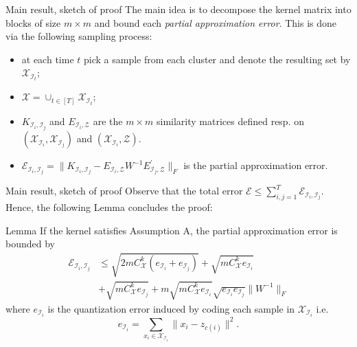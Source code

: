\documentclass{beamer}
\begin{document}
\begin{frame}{Main result, sketch of proof}
    The main idea is to decompose the kernel matrix into blocks of size $m \times m$ and bound each \emph{partial approximation error}. This is done via the following sampling process:
    \begin{itemize}
        \item at each time $t$ pick a sample from each cluster and denote the resulting set by $\mathcal{X}_{\mathcal{I}_t}$;
        \item $\mathcal{X} = \cup_{t\in [T]} \mathcal{X}_{\mathcal{I}_t}$;
        \item $K_{\mathcal{I}_i,\mathcal{I}_j}$ and $E_{\mathcal{I}_i,\mathcal{Z}}$ are the $m\times m$ similarity matrices defined resp. on $(\mathcal{X}_{\mathcal{I}_i}, \mathcal{X}_{\mathcal{I}_j} )$ and $(\mathcal{X}_{\mathcal{I}_i}, \mathcal{Z} )$.
        \item $\mathcal{E}_{\mathcal{I}_i,\mathcal{I}_j} = \|K_{\mathcal{I}_i,\mathcal{I}_j} - E_{\mathcal{I}_i,\mathcal{Z}} W^{-1} E^{\prime}_{\mathcal{I}_j,\mathcal{Z}} \|_F $ is the partial approximation error.
    \end{itemize}

    
\end{frame}

\begin{frame}{Main result, sketch of proof}
     Observe that the total error $\mathcal{E} \leq \sum_{i,j=1}^T \mathcal{E}_{\mathcal{I}_i,\mathcal{I}_j}  $. Hence, the following Lemma concludes the proof:
     \begin{block}{Lemma}
     If the kernel satisfies Assumption A, the partial approximation error is bounded by
     \begin{equation*}
     \begin{split}
         \mathcal{E}_{\mathcal{I}_i,\mathcal{I}_j} &\leq \sqrt{2mC_{\mathcal{X}}^k(e_{\mathcal{I}_i}+e_{\mathcal{I}_j})}+\sqrt{mC_{\mathcal{X}}^k e_{\mathcal{I}_i}}\\ &+\sqrt{mC_{\mathcal{X}}^k e_{\mathcal{I}_j}} + m\sqrt{mC_{\mathcal{X}}^k e_{\mathcal{I}_i}} \sqrt{e_{\mathcal{I}_i}e_{\mathcal{I}_j}} \|W^{-1}\|_F
         \end{split}
     \end{equation*}
     where $ e_{\mathcal{I}_i} $ is the quantization error induced by coding each sample in $\mathcal{X}_{\mathcal{I}_i} $ i.e. 
     \begin{equation*}
         e_{\mathcal{I}_i} = \sum_{x_i \in \mathcal{X}_{\mathcal{I}_i}} \|x_i-z_{c(i)}\|^2.
     \end{equation*}
     \end{block}
\end{frame}
\end{document}
